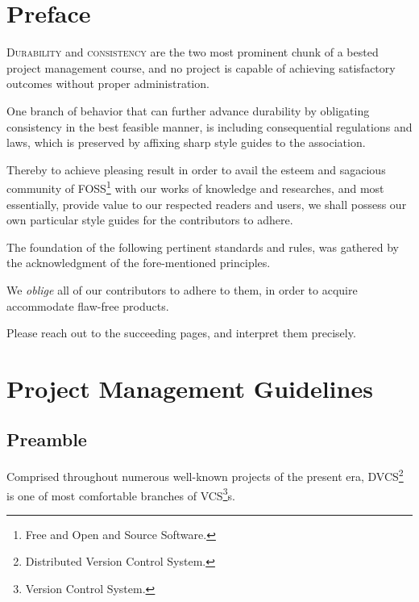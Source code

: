 \documentclass[13pt]{scrarticle}
\newcommand{\header}[1]{ \textsf{#1} \relax{}}
\newcommand{\important}[1]{\textit{#1}}
\newcommand{\name}[1]{{\textsc{#1}}}
\begin{document}
    \newpage
    \section{\header{Preface}}


    \name{Durability } and \name{consistency } are the two most prominent chunk of a bested project management course,
    and no project is capable of achieving satisfactory outcomes without proper administration. \newline

    One branch of behavior that can further advance durability by obligating consistency in the best feasible manner,
    is including consequential regulations and laws,
    which is preserved by affixing sharp style guides to the association. \newline

    Thereby to achieve pleasing result in order to avail the esteem and sagacious community of \name{FOSS}\footnote{Free and Open and Source Software.} with our works of knowledge and researches,
    and most essentially, provide value to our respected readers and users,
    we shall possess our own particular style guides for the contributors to adhere. \newline

    The foundation of the following pertinent standards and rules, was gathered by the acknowledgment of the fore-mentioned
    principles. \newline

    We \important{oblige} all of our contributors to adhere to them,
    in order to acquire accommodate flaw-free products. \newline

    Please reach out to the succeeding pages,
    and interpret them precisely.


    \newpage
    \thispagestyle{fancy}

    \section{\header{Project Management Guidelines}}
    \subsection{\header{Preamble}}

    Comprised throughout numerous well-known projects of the present era,
    \name{DVCS}\footnote{Distributed Version Control System.} is one of most comfortable branches of \name{VCS}\footnote{Version Control System.}s. \newline
\end{document}
